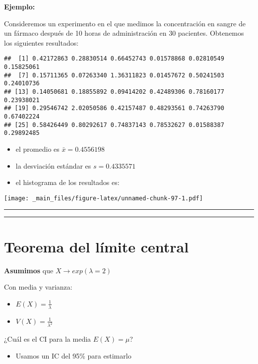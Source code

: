 \documentclass[
]{book}
\providecommand{\tightlist}{%
  \setlength{\itemsep}{0pt}\setlength{\parskip}{0pt}}
\begin{document}
\textbf{Ejemplo:}

Consideremos un experimento en el que medimos la concentración en sangre de un fármaco después de 10 horas de administración en \(30\) pacientes. Obtenemos los siguientes resultados:

\begin{verbatim}
##  [1] 0.42172863 0.28830514 0.66452743 0.01578868 0.02810549 0.15825061
##  [7] 0.15711365 0.07263340 1.36311823 0.01457672 0.50241503 0.24010736
## [13] 0.14050681 0.18855892 0.09414202 0.42489306 0.78160177 0.23938021
## [19] 0.29546742 2.02050586 0.42157487 0.48293561 0.74263790 0.67402224
## [25] 0.58426449 0.80292617 0.74837143 0.78532627 0.01588387 0.29892485
\end{verbatim}

\begin{itemize}
\item
  el promedio es \(\bar{x}=0.4556198\)
\item
  la desviación estándar es \(s=0.4335571\)
\item
  el histograma de los resultados es:
\end{itemize}

\texttt{[image: \_main\_files/figure-latex/unnamed-chunk-97-1.pdf]}

\begin{center}\rule{0.5\linewidth}{0.5pt}\end{center}

\begin{center}\rule{0.5\linewidth}{0.5pt}\end{center}

\hypertarget{teorema-del-luxedmite-central-4}{%
\section{Teorema del límite central}\label{teorema-del-luxedmite-central-4}}

\textbf{Asumimos} que \(X \rightarrow exp(\lambda=2)\)

Con media y varianza:

\begin{itemize}
\tightlist
\item
  \(E(X)=\frac{1}{\lambda}\)
\item
  \(V(X)=\frac{1}{\lambda^2}\)
\end{itemize}

¿Cuál es el CI para la media \(E(X)=\mu\)?

\begin{itemize}
\tightlist
\item
  Usamos un IC del 95\% para estimarlo
\end{itemize}
\end{document}
